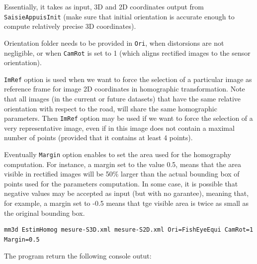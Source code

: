 \noindent Essentially, it takes as input, 3D and 2D coordinates output from \texttt{SaisieAppuisInit} (make sure that initial orientation is accurate enough to compute relatively precise 3D coordinates). \newline

\noindent Orientation folder needs to be provided in \texttt{Ori}, when distorsions are not negligible, or when \texttt{CamRot} is set to 1 (which aligns rectified images to the sensor orientation). \newline

\noindent \texttt{ImRef} option is used when we want to force the selection of a particular image as reference frame for image 2D coordinates in homographic transformation. Note that all images (in the current or future datasets) that have the same relative orientation with respect to the road, will share the same homographic parameters. Then \texttt{ImRef} option may be used if we want to force the selection of a very representative image, even if in this image does not contain a maximal number of points (provided that it contains at least 4 points). \newline

\noindent Eventually \texttt{Margin} option enables to set the area used for the homography computation. For instance, a margin set to the value 0.5, means that the area visible in rectified images will be 50\% larger than the actual bounding box of points used for the parameters computation. In some case, it is possible that negative values may be accepted as input (but with no garantee), meaning that, for example, a margin set to -0.5 means that tge visible area is twice as small as the original bounding box. \newline

\begin{verbatim}
mm3d EstimHomog mesure-S3D.xml mesure-S2D.xml Ori=FishEyeEqui CamRot=1 Margin=0.5
\end{verbatim}

\noindent The program return the following console outut: \newline

